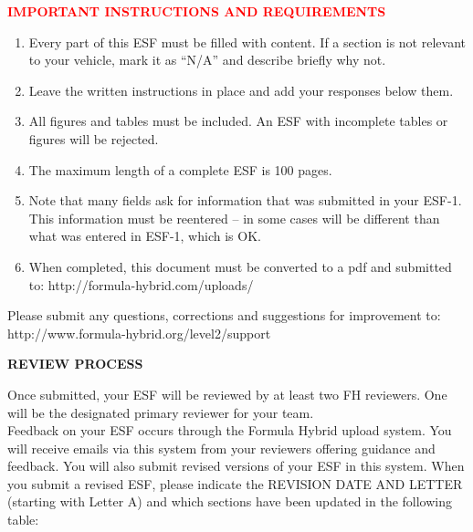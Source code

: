 \documentclass{article}
\begin{document}
        \textcolor{red}{\textbf{IMPORTANT INSTRUCTIONS AND REQUIREMENTS}}

    \begin{enumerate}
        \item Every part of this ESF must be filled with content. If a section is not relevant to your vehicle, mark it as “N/A” and describe briefly why not.
        \item Leave the written instructions in place and add your responses below them.
        \item All figures and tables must be included. An ESF with incomplete tables or figures will be rejected.
        \item The maximum length of a complete ESF is 100 pages.
        \item Note that many fields ask for information that was submitted in your ESF-1. This information must be reentered – in some cases will be different than what was entered in ESF-1, which is OK.
        \item When completed, this document must be converted to a pdf and submitted to: http://formula-hybrid.com/uploads/
    \end{enumerate}

    Please submit any questions, corrections and suggestions for improvement to: http://www.formula-hybrid.org/level2/support

    \newpage

    \textbf{REVIEW PROCESS}

        Once submitted, your ESF will be reviewed by at least two FH reviewers. One will be the designated primary reviewer for your team.\\

        Feedback on your ESF occurs through the Formula Hybrid upload system. You will receive emails via this system from your reviewers offering guidance and feedback. You will also submit revised versions of your ESF in this system. When you submit a revised ESF, please indicate the REVISION DATE AND LETTER (starting with Letter A) and which sections have been updated in the following table:
\end{document}
